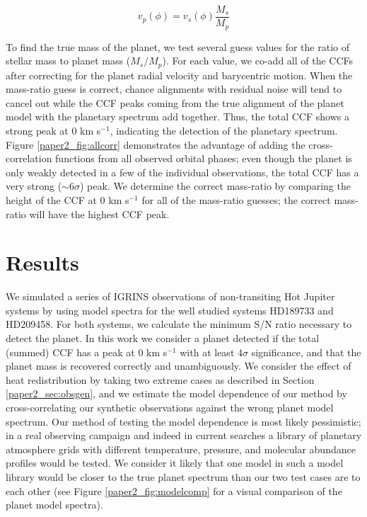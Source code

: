 \begin{equation}
v_p (\phi) = v_s(\phi) \frac{M_s}{M_p}
\label{paper2_eqn:planetmass}
\end{equation}

To find the true mass of the planet, we test several guess values for the ratio of stellar mass to planet mass ($M_s/M_p$). For each value, we co-add all of the CCFs after correcting for the planet radial velocity and barycentric motion. When the mass-ratio guess is correct, chance alignments with residual noise will tend to cancel out while the CCF peaks coming from the true alignment of the planet model with the planetary spectrum add together. Thus, the total CCF shows a strong peak at 0 km s$^{-1}$, indicating the detection of the planetary spectrum. Figure \ref{paper2_fig:allcorr} demonstrates the advantage of adding the cross-correlation functions from all observed orbital phases; even though the planet is only weakly detected in a few of the individual observations, the total CCF has a very strong ($\sim 6 \sigma$) peak. We determine the correct mass-ratio by comparing the height of the CCF at 0 km s$^{-1}$ for all of the mass-ratio guesses; the correct mass-ratio will have the highest CCF peak.


\section{Results}
\label{paper2_sec:results}
We simulated a series of IGRINS observations of non-transiting Hot Jupiter systems by using model spectra for the well studied systems HD189733 and HD209458. For both systems, we calculate the minimum S/N ratio necessary to detect the planet. In this work we consider a planet detected if the total (summed) CCF has a peak at 0 km s$^{-1}$ with at least $4\sigma$ significance, and that the planet mass is recovered correctly and unambiguously. We consider the effect of heat redistribution by taking two extreme cases as described in Section \ref{paper2_sec:obsgen}, and we estimate the model dependence of our method by cross-correlating our synthetic observations against the wrong planet model spectrum. Our method of testing the model dependence is most likely pessimistic; in a real observing campaign and indeed in current searches \citep{Brogi2012, Brogi2013, Rodler2012, deKok2013} a library of planetary atmosphere grids with different temperature, pressure, and molecular abundance profiles would be tested. We consider it likely that one model in such a model library would be closer to the true planet spectrum than our two test cases are to each other (see Figure \ref{paper2_fig:modelcomp} for a visual comparison of the planet model spectra).


